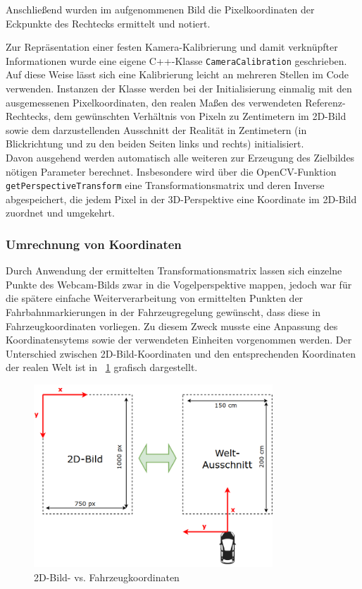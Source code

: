 Anschlie\ss end wurden im aufgenommenen Bild die Pixelkoordinaten der Eckpunkte des Rechtecks ermittelt und notiert.

Zur Repr\"asentation einer festen Kamera-Kalibrierung und damit verkn\"upfter Informationen wurde eine eigene
C++-Klasse \texttt{CameraCalibration} geschrieben. Auf diese Weise l\"asst sich eine Kalibrierung leicht an mehreren
Stellen im Code verwenden. Instanzen der Klasse werden bei der Initialisierung einmalig
mit den ausgemessenen Pixelkoordinaten, den realen Ma\ss en des verwendeten Referenz-Rechtecks, dem gew\"unschten
Verh\"altnis von Pixeln zu Zentimetern im 2D-Bild sowie dem darzustellenden
Ausschnitt der Realit\"at in Zentimetern (in Blickrichtung und zu den beiden Seiten links
und rechts) initialisiert.\\
Davon ausgehend werden automatisch alle weiteren zur Erzeugung des Zielbildes n\"otigen Parameter berechnet.
Insbesondere wird \"uber die OpenCV-Funktion \texttt{getPerspectiveTransform} eine Transformationsmatrix
und deren Inverse abgespeichert, die jedem Pixel in der 3D-Perspektive eine Koordinate im 2D-Bild zuordnet
und umgekehrt.

\subsubsection{Umrechnung von Koordinaten}

Durch Anwendung der ermittelten Transformationsmatrix lassen sich einzelne Punkte des Webcam-Bilds zwar
in die Vogelperspektive mappen, jedoch war f\"ur die sp\"atere einfache Weiterverarbeitung von ermittelten Punkten
der Fahrbahnmarkierungen in der Fahrzeugregelung gew\"unscht, dass diese in Fahrzeugkoordinaten vorliegen.
Zu diesem Zweck musste eine Anpassung des Koordinatensytems sowie der verwendeten Einheiten vorgenommen
werden. Der Unterschied zwischen 2D-Bild-Koordinaten und den entsprechenden Koordinaten der realen
Welt ist in \figurename\ \ref{fig:koordinatensysteme} grafisch dargestellt.

\begin{figure}[h]
	\centering
	\includegraphics[width = 0.8\textwidth]{images/Koordinatenumrechnung.png}
	\caption{2D-Bild- vs. Fahrzeugkoordinaten}
	\label{fig:koordinatensysteme}
\end{figure}

